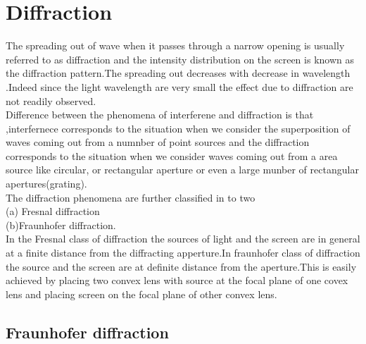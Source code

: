 \chapter{Diffraction}
The spreading out of wave when it passes through a narrow opening is usually referred to as diffraction and the intensity distribution on the screen is known as the diffraction pattern.The spreading out decreases with decrease in wavelength .Indeed since the light wavelength are very small the effect due to diffraction are not readily observed.\\
Difference between the phenomena of interferene and diffraction is that ,interfernece corresponds to the situation when we consider the superposition of waves coming out from a numnber of point sources and the diffraction corresponds to the situation when we consider waves coming out from a area source like circular, or rectangular aperture or even a large munber of rectangular apertures(grating).\\
The diffraction phenomena are further classified in to two\\
(a) Fresnal diffraction \\
(b)Fraunhofer diffraction.\\
In the Fresnal class of diffraction the sources of light and the screen are in general at a finite distance from the diffracting apperture.In fraunhofer class of diffraction the source and the screen are at definite distance from the aperture.This is easily achieved by placing two convex lens with source at the focal plane of one covex lens and placing screen on the focal plane of other convex lens.\\
\section{Fraunhofer diffraction}
